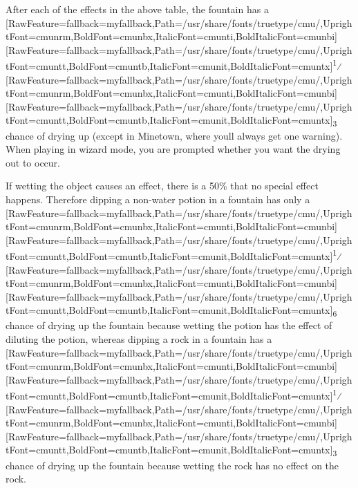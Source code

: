 After each of the effects in the above table, the fountain has a \allowbreak{}\setmainfont{cmunrm.ttf}[RawFeature={fallback=myfallback},Path=/usr/share/fonts/truetype/cmu/,UprightFont=cmunrm,BoldFont=cmunbx,ItalicFont=cmunti,BoldItalicFont=cmunbi]\setmonofont{cmunrm.ttf}[RawFeature={fallback=myfallback},Path=/usr/share/fonts/truetype/cmu/,UprightFont=cmuntt,BoldFont=cmuntb,ItalicFont=cmunit,BoldItalicFont=cmuntx]\textsuperscript{1}⁄\allowbreak{}\setmainfont{cmunrm.ttf}[RawFeature={fallback=myfallback},Path=/usr/share/fonts/truetype/cmu/,UprightFont=cmunrm,BoldFont=cmunbx,ItalicFont=cmunti,BoldItalicFont=cmunbi]\setmonofont{cmunrm.ttf}[RawFeature={fallback=myfallback},Path=/usr/share/fonts/truetype/cmu/,UprightFont=cmuntt,BoldFont=cmuntb,ItalicFont=cmunit,BoldItalicFont=cmuntx]\textsubscript{3} chance of drying up (except in Minetown\footnotemark[69], where you\textquotesingle{}ll always get one warning\footnotemark[70]). When playing in wizard mode\footnotemark[71], you are prompted whether you want the drying out to occur.


If wetting the object causes an effect, there is a 50\% that no special effect happens. Therefore dipping a non-{}water potion in a fountain has only a \allowbreak{}\setmainfont{cmunrm.ttf}[RawFeature={fallback=myfallback},Path=/usr/share/fonts/truetype/cmu/,UprightFont=cmunrm,BoldFont=cmunbx,ItalicFont=cmunti,BoldItalicFont=cmunbi]\setmonofont{cmunrm.ttf}[RawFeature={fallback=myfallback},Path=/usr/share/fonts/truetype/cmu/,UprightFont=cmuntt,BoldFont=cmuntb,ItalicFont=cmunit,BoldItalicFont=cmuntx]\textsuperscript{1}⁄\allowbreak{}\setmainfont{cmunrm.ttf}[RawFeature={fallback=myfallback},Path=/usr/share/fonts/truetype/cmu/,UprightFont=cmunrm,BoldFont=cmunbx,ItalicFont=cmunti,BoldItalicFont=cmunbi]\setmonofont{cmunrm.ttf}[RawFeature={fallback=myfallback},Path=/usr/share/fonts/truetype/cmu/,UprightFont=cmuntt,BoldFont=cmuntb,ItalicFont=cmunit,BoldItalicFont=cmuntx]\textsubscript{6} chance of drying up the fountain because wetting the potion has the effect of diluting the potion, whereas dipping a rock in a fountain has a \allowbreak{}\setmainfont{cmunrm.ttf}[RawFeature={fallback=myfallback},Path=/usr/share/fonts/truetype/cmu/,UprightFont=cmunrm,BoldFont=cmunbx,ItalicFont=cmunti,BoldItalicFont=cmunbi]\setmonofont{cmunrm.ttf}[RawFeature={fallback=myfallback},Path=/usr/share/fonts/truetype/cmu/,UprightFont=cmuntt,BoldFont=cmuntb,ItalicFont=cmunit,BoldItalicFont=cmuntx]\textsuperscript{1}⁄\allowbreak{}\setmainfont{cmunrm.ttf}[RawFeature={fallback=myfallback},Path=/usr/share/fonts/truetype/cmu/,UprightFont=cmunrm,BoldFont=cmunbx,ItalicFont=cmunti,BoldItalicFont=cmunbi]\setmonofont{cmunrm.ttf}[RawFeature={fallback=myfallback},Path=/usr/share/fonts/truetype/cmu/,UprightFont=cmuntt,BoldFont=cmuntb,ItalicFont=cmunit,BoldItalicFont=cmuntx]\textsubscript{3} chance of drying up the fountain because wetting the rock has no effect on the rock.


